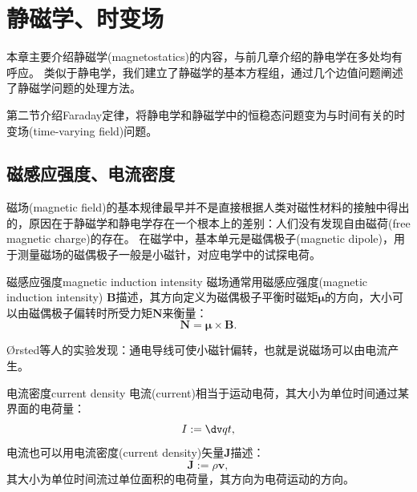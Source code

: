 \renewcommand{\mag}{\mathrm m}

\chapter{静磁学、时变场}

\label{chap:magnetostatics}

本章主要介绍静磁学(magnetostatics)的内容，与前几章介绍的静电学在多处均有呼应。%
类似于静电学，我们建立了静磁学的基本方程组，通过几个边值问题阐述了静磁学问题的处理方法。%

第二节介绍Faraday定律，将静电学和静磁学中的恒稳态问题变为与时间有关的时变场(time-varying field)问题。

\section{磁感应强度、电流密度}
\label{sec:introduction to magnetostatics}

磁场(magnetic field)的基本规律最早并不是直接根据人类对磁性材料的接触中得出的，原因在于静磁学和静电学存在一个根本上的差别：人们没有发现自由磁荷(free magnetic charge)的存在。
在磁学中，基本单元是磁偶极子(magnetic dipole)，用于测量磁场的磁偶极子一般是小磁针，对应电学中的试探电荷。
\begin{definition}
    {磁感应强度}{magnetic induction intensity}
    磁场通常用磁感应强度(magnetic induction intensity) $\bm B$描述，其方向定义为磁偶极子平衡时磁矩$\bm\mu$的方向，大小可以由磁偶极子偏转时所受力矩$\bm N$来衡量：
    \begin{equation}
        \bm N=\bm\mu\times\bm B.
    \end{equation}
\end{definition}
Ørsted等人的实验发现：通电导线可使小磁针偏转，也就是说磁场可以由电流产生。
\begin{definition}
    {电流密度}{current density}
    电流(current)相当于运动电荷，其大小为单位时间通过某界面的电荷量：
    \begin{equation}
        I:=\dv qt,
    \end{equation}
    电流也可以用电流密度(current density)矢量$\bm J$描述：
    \begin{equation}
        \bm J:=\rho\bm v,
    \end{equation}
    其大小为单位时间流过单位面积的电荷量，其方向为电荷运动的方向。
\end{definition}


